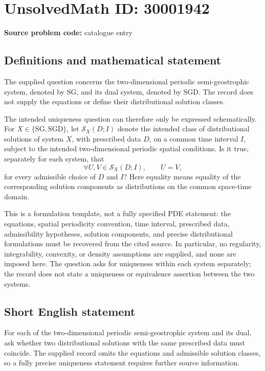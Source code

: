 \documentclass[11pt]{article}
\begin{document}
\section*{UnsolvedMath ID: 30001942}
\textbf{Source problem code:} catalogue entry
\subsection{Definitions and mathematical statement}
The supplied question concerns the two-dimensional periodic semi-geostrophic system, denoted by \(\mathrm{SG}\), and its dual system, denoted by \(\mathrm{SGD}\). The record does not supply the equations or define their distributional solution classes.

The intended uniqueness question can therefore only be expressed schematically. For \(X\in\{\mathrm{SG},\mathrm{SGD}\}\), let \(\mathcal S_X(D;I)\) denote the intended class of distributional solutions of system \(X\), with prescribed data \(D\), on a common time interval \(I\), subject to the intended two-dimensional periodic spatial conditions. Is it true, separately for each system, that
\[
\forall U,V\in\mathcal S_X(D;I),\qquad U=V,
\]
for every admissible choice of \(D\) and \(I\)? Here equality means equality of the corresponding solution components as distributions on the common space-time domain.

This is a formulation template, not a fully specified PDE statement: the equations, spatial periodicity convention, time interval, prescribed data, admissibility hypotheses, solution components, and precise distributional formulations must be recovered from the cited source. In particular, no regularity, integrability, convexity, or density assumptions are supplied, and none are imposed here. The question asks for uniqueness within each system separately; the record does not state a uniqueness or equivalence assertion between the two systems.
\subsection{Short English statement}
For each of the two-dimensional periodic semi-geostrophic system and its dual, ask whether two distributional solutions with the same prescribed data must coincide. The supplied record omits the equations and admissible solution classes, so a fully precise uniqueness statement requires further source information.
\end{document}
